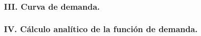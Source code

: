 \begin{enumerate}
\begin{enumerate}[\bfseries (4.1)]
\begin{enumerate}[1.-]
		\end{enumerate}

	\end{enumerate}

\subsubsection*{\center III. Curva de demanda.}
\vspace{.5cm}

\subsubsection*{\center IV. Cálculo analítico de la función de demanda.}
\vspace{.5cm}

\end{enumerate}
